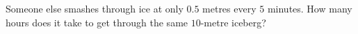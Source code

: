 Someone else smashes through ice at only $0.5$ metres every $5$ minutes. How many hours does it take to get through the same $10$-metre iceberg?
